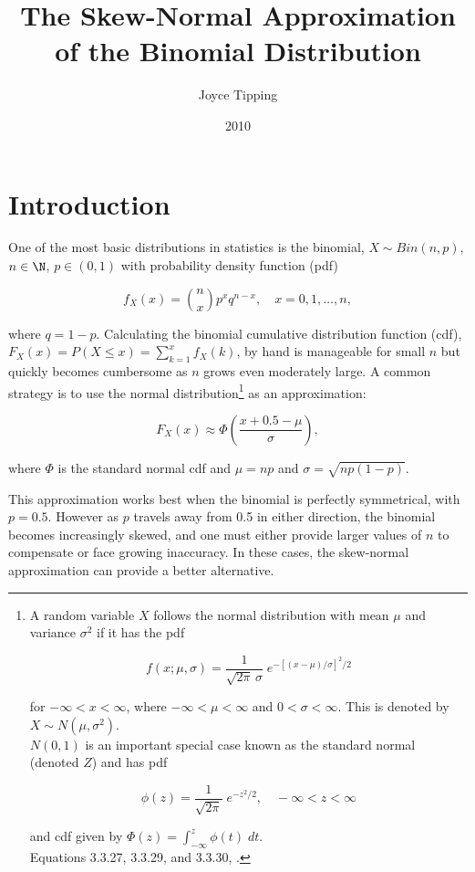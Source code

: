 \title{The Skew-Normal Approximation of the Binomial Distribution}
\author{Joyce Tipping}
\date{2010}
\maketitle

\section{Introduction}

One of the most basic distributions in statistics is the binomial, $X \sim
Bin(n,p)$, $n \in \N$, $p \in (0, 1)$ with probability density function (pdf)

\begin{equation*}
  f_X(x) = \binom{n}{x} p^x q^{n-x}, \quad x = 0, 1, \ldots, n,
\end{equation*}

where $q=1-p$. Calculating the binomial cumulative distribution function (cdf),
$F_X(x) = P(X \leq x) = \sum_{k=1}^x f_X(k)$, by hand is manageable for small
$n$ but quickly becomes cumbersome as $n$ grows even moderately large. A common
strategy is to use the normal distribution\footnote{A random variable $X$
follows the normal distribution with mean $\mu$ and variance $\sigma^2$ if it
has the pdf

\begin{equation*}
  f(x;\mu,\sigma) = \frac{1}{\sqrt{2\pi}\,\sigma} \; e^{-[(x-\mu)/\sigma]^2/2}
\end{equation*}

for $-\infty < x < \infty$, where $-\infty < \mu < \infty$ and $0 < \sigma <
\infty$. This is denoted by $X \sim N(\mu,\sigma^2)$.\\

$N(0,1)$ is an important special case known as the standard normal (denoted
$Z$) and has pdf

\begin{equation*}
  \phi(z) = \frac{1}{\sqrt{2\pi}} \; e^{-z^2/2}, \quad -\infty < z < \infty
\end{equation*}

and cdf given by $\Phi(z) = \int_{-\infty}^z \phi(t)\;dt$.\\

Equations 3.3.27, 3.3.29, and 3.3.30, \citet{textbook}.} as an approximation:

\begin{equation}
  F_X(x) \approx \Phi \left( \frac{x + 0.5 - \mu}{\sigma} \right),
\end{equation}

where $\Phi$ is the standard normal cdf and $\mu = np$ and $\sigma =
\sqrt{np(1-p)}$.

This approximation works best when the binomial is perfectly symmetrical, with
$p=0.5$. However as $p$ travels away from 0.5 in either direction, the binomial
becomes increasingly skewed, and one must either provide larger values of $n$
to compensate or face growing inaccuracy. In these cases, the skew-normal
approximation can provide a better alternative.

